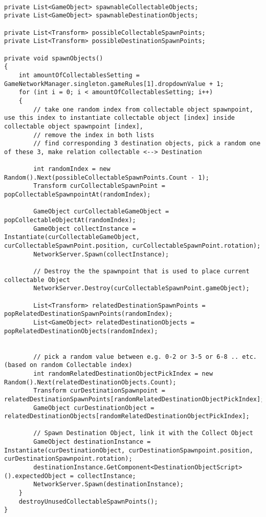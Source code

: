 \begin{lstlisting}[caption= PrepareGameManager.cs Variablen und spawnObjects()]
	
private List<GameObject> spawnableCollectableObjects;
private List<GameObject> spawnableDestinationObjects;

private List<Transform> possibleCollectableSpawnPoints;
private List<Transform> possibleDestinationSpawnPoints;

private void spawnObjects()
{
	int amountOfCollectablesSetting = GameNetworkManager.singleton.gameRules[1].dropdownValue + 1;
	for (int i = 0; i < amountOfCollectablesSetting; i++)
	{
		// take one random index from collectable object spawnpoint, use this index to instantiate collectable object [index] inside collectable object spawnpoint [index],
		// remove the index in both lists
		// find corresponding 3 destination objects, pick a random one of these 3, make relation collectable <--> Destination
		
		int randomIndex = new Random().Next(possibleCollectableSpawnPoints.Count - 1);
		Transform curCollectableSpawnPoint = popCollectableSpawnpointAt(randomIndex);
		
		GameObject curCollectableGameObject = popCollectableObjectAt(randomIndex);
		GameObject collectInstance = Instantiate(curCollectableGameObject, curCollectableSpawnPoint.position, curCollectableSpawnPoint.rotation);
		NetworkServer.Spawn(collectInstance);
		
		// Destroy the the spawnpoint that is used to place current collectable Object
		NetworkServer.Destroy(curCollectableSpawnPoint.gameObject);
		
		List<Transform> relatedDestinationSpawnPoints = popRelatedDestinationSpawnPoints(randomIndex);
		List<GameObject> relatedDestinationObjects = popRelatedDestinationObjects(randomIndex);

		
		// pick a random value between e.g. 0-2 or 3-5 or 6-8 .. etc. (based on random Collectable index)
		int randomRelatedDestinationObjectPickIndex = new Random().Next(relatedDestinationObjects.Count);
		Transform curDestinationSpawnpoint = relatedDestinationSpawnPoints[randomRelatedDestinationObjectPickIndex];
		GameObject curDestinationObject = relatedDestinationObjects[randomRelatedDestinationObjectPickIndex];
		
		// Spawn Destination Object, link it with the Collect Object
		GameObject destinationInstance = Instantiate(curDestinationObject, curDestinationSpawnpoint.position, curDestinationSpawnpoint.rotation);
		destinationInstance.GetComponent<DestinationObjectScript>().expectedObject = collectInstance;
		NetworkServer.Spawn(destinationInstance);
	}
	destroyUnusedCollectableSpawnPoints();
}
\end{lstlisting}


